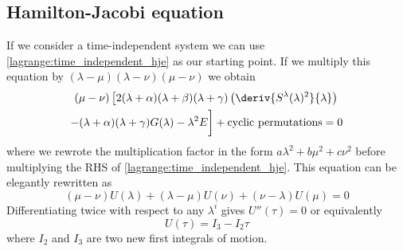     \subsection{Hamilton-Jacobi equation}
    If we consider a time-independent system we can use \ref{lagrange:time_independent_hje} as our starting point. If we multiply this equation by $(\lambda - \mu)(\lambda - \nu)(\mu - \nu)$ we obtain
    \begin{multline}
    	(\mu - \nu)\left[2(\lambda + \alpha)(\lambda + \beta)(\lambda + \gamma)\left(\deriv{S^\lambda(\lambda)^2}{\lambda}\right)\right.\\ - (\lambda + \alpha)(\lambda + \gamma)G(\lambda) - \lambda^2E \bigg] + \text{cyclic permutations} = 0
    \end{multline}
    where we rewrote the multiplication factor in the form $a\lambda^2 + b\mu^2 + c\nu^2$ before multiplying the RHS of \ref{lagrange:time_independent_hje}. This equation can be elegantly rewritten as
    \begin{equation}
    	(\mu-\nu)U(\lambda) + (\lambda - \mu)U(\nu) + (\nu - \lambda)U(\mu) = 0
    \end{equation}
    Differentiating twice with respect to any $\lambda^i$ gives $U''(\tau) = 0$ or equivalently
    \begin{equation}
    	U(\tau) = I_3 - I_2\tau
    \end{equation}
    where $I_2$ and $I_3$ are two new first integrals of motion.
    
